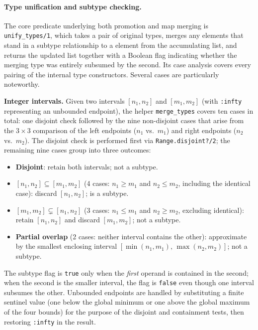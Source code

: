 \paragraph{Type unification and subtype checking.}
The core predicate underlying both promotion and map merging is \texttt{unify\_types/1}, which takes a pair of original types, merges any elements that stand in a subtype relationship to a element from the accumulating list, and returns the updated list together with a Boolean flag indicating whether the merging type was entirely subsumed by the second.
Its case analysis covers every pairing of the internal type constructors.
Several cases are particularly noteworthy.

\medskip
\noindent\textbf{Integer intervals.}
Given two intervals $[n_1, n_2]$ and $[m_1, m_2]$ (with \texttt{:infty} representing an unbounded endpoint), the helper \texttt{merge\_types} covers ten cases in total: one disjoint check followed by the nine non-disjoint cases that arise from the $3 \times 3$ comparison of the left endpoints ($n_1$ vs.\ $m_1$) and right endpoints ($n_2$ vs.\ $m_2$).
The disjoint check is performed first via \texttt{Range.disjoint?/2}; the remaining nine cases group into three outcomes:
\begin{itemize}
    \item \textbf{Disjoint}: retain both intervals; not a subtype.
    \item \textbf{$[n_1,n_2] \subseteq [m_1,m_2]$} (4 cases: $n_1 \geq m_1$ and $n_2 \leq m_2$, including the identical case): discard $[n_1,n_2]$; is a subtype.
    \item \textbf{$[m_1,m_2] \subsetneq [n_1,n_2]$} (3 cases: $n_1 \leq m_1$ and $n_2 \geq m_2$, excluding identical): retain $[n_1,n_2]$ and discard $[m_1,m_2]$; not a subtype.
    \item \textbf{Partial overlap} (2 cases: neither interval contains the other): approximate by the smallest enclosing interval $[\min(n_1,m_1),\, \max(n_2,m_2)]$; not a subtype.
\end{itemize}
The subtype flag is \texttt{true} only when the \emph{first} operand is contained in the second; when the second is the smaller interval, the flag is \texttt{false} even though one interval subsumes the other.
Unbounded endpoints are handled by substituting a finite sentinel value (one below the global minimum or one above the global maximum of the four bounds) for the purpose of the disjoint and containment tests, then restoring \texttt{:infty} in the result.

